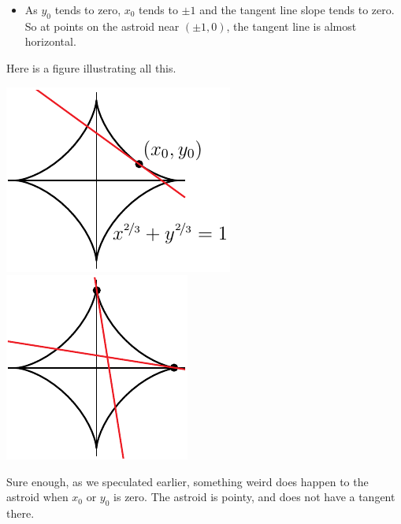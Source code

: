 \begin{eg}
\begin{itemize}
\item As $y_0$ tends to zero, $x_0$ tends to $\pm 1$ and the
tangent line slope tends to zero. So at points on the astroid near
$(\pm 1,0)$, the tangent line is almost horizontal.
\end{itemize}
Here is a figure illustrating all this.
\begin{efig}
\begin{center}
   \includegraphics{astroid}\qquad\includegraphics{astroidB}
\end{center}
\end{efig}
Sure enough, as we speculated earlier, something weird does happen
to the astroid when $x_0$ or $y_0$ is zero. The astroid is pointy,
and does not have a tangent there.
\end{eg}



